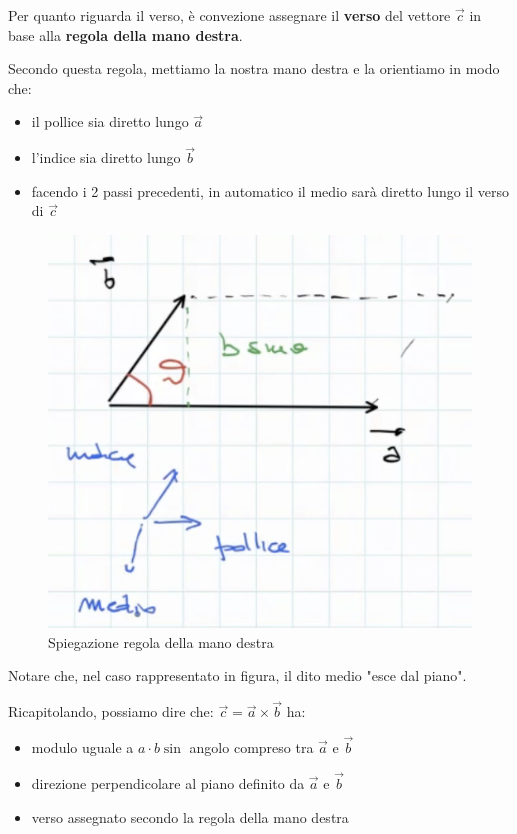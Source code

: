 \documentclass[a4paper]{book}
\begin{document}
Per quanto riguarda il verso, è convezione assegnare il \textbf{verso} del vettore $ \overrightarrow{c} $ in base alla \textbf{regola della mano destra}.

Secondo questa regola,  mettiamo la nostra mano destra e la orientiamo in modo che:

\begin{itemize}
\item il pollice sia diretto lungo $ \overrightarrow{a} $
\item l'indice sia diretto lungo $ \overrightarrow{b} $
\item facendo i 2 passi precedenti, in automatico il medio sarà diretto lungo il verso di $ \overrightarrow{c} $
\end{itemize}

\newpage

\begin{figure}[h]
\begin{center}
\includegraphics[width = 0.5 \textwidth]{manodx}
\caption{Spiegazione regola della mano destra}
\label{fig:manodx}
\end{center}
\end{figure}

Notare che, nel caso rappresentato in figura, il dito medio "esce dal piano".

Ricapitolando, possiamo dire che: $\overrightarrow{c} = \overrightarrow{a} \times \overrightarrow{b} $ ha:

\begin{itemize}
\item modulo uguale a $ a \cdot b \sin $ angolo compreso tra $ \overrightarrow{a} $ e $ \overrightarrow{b} $
\item direzione perpendicolare al piano definito da $ \overrightarrow{a} $ e $ \overrightarrow{b} $
\item verso assegnato secondo la regola della mano destra
\end{itemize}
\end{document}
